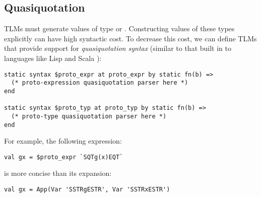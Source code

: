 \subsection{Quasiquotation}
TLMs must generate values of type  or . Constructing values of these types explicitly can have high syntactic cost. To decrease this cost, we can define TLMs that provide support for \emph{quasiquotation syntax} (similar to that built in to languages like Lisp \cite{Bawd99a} and Scala \cite{shabalin2013quasiquotes}):
\begin{lstlisting}[numbers=none]
static syntax $proto_expr at proto_expr by static fn(b) => 
  (* proto-expression quasiquotation parser here *)
end

static syntax $proto_typ at proto_typ by static fn(b) => 
  (* proto-type quasiquotation parser here *)
end
\end{lstlisting}
For example, the following expression:
\begin{lstlisting}[numbers=none]
val gx = $proto_expr `SQTg(x)EQT`
\end{lstlisting}
is more concise than its expansion:
\begin{lstlisting}[numbers=none]
val gx = App(Var 'SSTRgESTR', Var 'SSTRxESTR')
\end{lstlisting}
